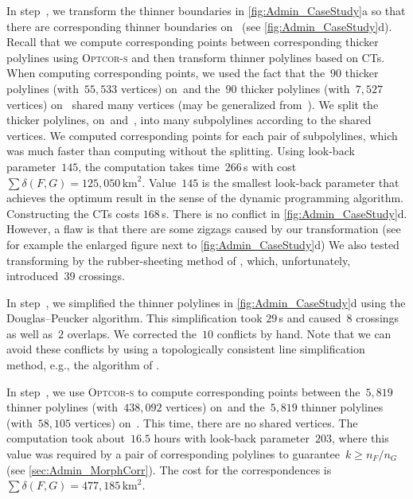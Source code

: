 In step~, we transform the thinner boundaries in 
\fig\ref{fig:Admin_CaseStudy}a
so that there are corresponding thinner boundaries on~\ms
(see \fig\ref{fig:Admin_CaseStudy}d).
Recall that we compute corresponding points between 
corresponding thicker polylines using \textsc{Optcor-s}
and then transform thinner polylines based on CTs.
When computing corresponding points, 
we used the fact that the~$90$ thicker polylines (with~$55{,}533$ vertices) on~\ml and 
the~$90$ thicker polylines (with~$7{,}527$ vertices) on~\ms 
shared many vertices (\ms may be generalized from~\ml).
We split the thicker polylines, on~\ml and~\ms, 
into many subpolylines according to the shared vertices. 
We computed corresponding points for each pair of subpolylines, 
which was much faster than computing without the splitting. 
Using look-back parameter~$145$, 
the computation takes time~$266\,$s 
with cost~$\sum \delta(F,G)=125{,}050\,\mathrm{km}^2$. 
Value~$145$ is the smallest look-back parameter
that achieves the optimum result in
the sense of the dynamic programming algorithm. 
Constructing the CTs costs $168\,$s. 
There is no conflict  in
\fig\ref{fig:Admin_CaseStudy}d. 
However, a flaw is that there are some zigzags 
caused by our transformation
(see for example the enlarged figure next to 
\fig\ref{fig:Admin_CaseStudy}d)
%
We also tested transforming by the rubber-sheeting method of 
\textcite{Doytsher2001}, 
which, unfortunately, introduced~$39$ crossings. 

In step~, we simplified the thinner polylines 
in \fig\ref{fig:Admin_CaseStudy}d
using the Douglas--Peucker algorithm. 
This simplification took $29\,$s 
and caused~$8$ crossings as well as~$2$ overlaps. 
We corrected the~$10$ conflicts by hand. 
Note that we can avoid these conflicts by using
a topologically consistent line simplification method, 
e.g., the algorithm of \textcite{Saalfeld1999}.

In step~, we use \mbox{\textsc{Optcor-s}} 
to compute corresponding points between 
the~$5{,}819$ thinner polylines 
(with~$438{,}092$ vertices) on~\ml and 
the~$5{,}819$ thinner polylines 
(with~$58{,}105$ vertices) on~\ms.
This time, there are no shared vertices.
The computation took about~$16.5$ hours 
with look-back parameter~$203$, 
where this value was required by 
a pair of corresponding polylines 
to guarantee~$k \geq n_F/n_G$ 
(see \sect\ref{sec:Admin_MorphCorr}).
The cost for the correspondences 
is~$\sum \delta(F,G)=477{,}185\,\mathrm{km}^2$.

